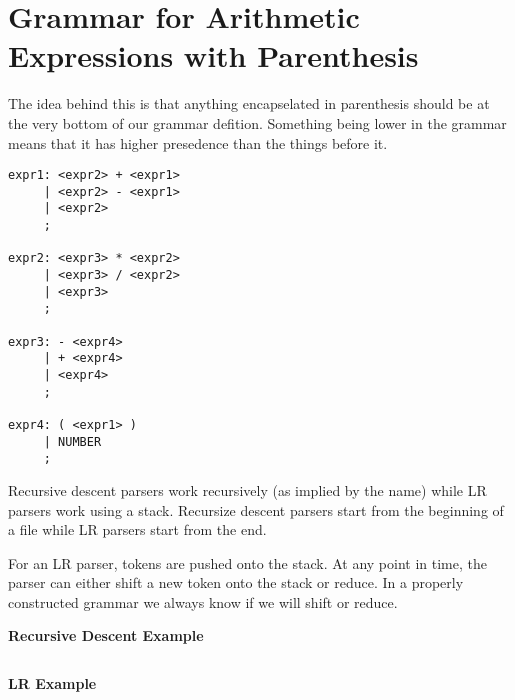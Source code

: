 \documentclass[11pt]{article}
\begin{document}
\newpage
\section{Grammar for Arithmetic Expressions with Parenthesis}
The idea behind this is that anything encapselated in parenthesis should be at
the very bottom of our grammar defition.  Something being lower in the grammar
means that it has higher presedence than the things before it.

\begin{lstlisting}
expr1: <expr2> + <expr1>
     | <expr2> - <expr1>
     | <expr2>
     ;

expr2: <expr3> * <expr2>
     | <expr3> / <expr2>
     | <expr3>
     ;

expr3: - <expr4>
     | + <expr4>
     | <expr4>
     ;

expr4: ( <expr1> )
     | NUMBER
     ;
\end{lstlisting}


Recursive descent parsers work recursively (as implied by the name) while LR
parsers work using a stack.  Recursize descent parsers start from the beginning
of a file while LR parsers start from the end.

For an LR parser, tokens are pushed onto the stack.  At any point in time, the
parser can either shift a new token onto the stack or reduce.  In a properly
constructed grammar we always know if we will shift or reduce.  

\textbf{Recursive Descent Example}


\begin{lstlisting}
\end{lstlisting}

\textbf{LR Example}


\begin{lstlisting}
\end{lstlisting}
\end{document}
